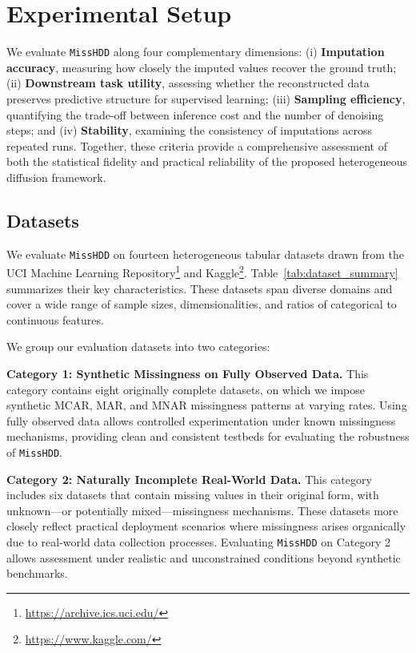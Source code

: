 \documentclass[times, review, 10pt]{elsarticle}
\begin{document}
\section{Experimental Setup}

We evaluate \texttt{MissHDD} along four complementary dimensions:
(i) \textbf{Imputation accuracy}, measuring how closely the imputed values recover the ground truth;
(ii) \textbf{Downstream task utility}, assessing whether the reconstructed data preserves predictive structure for supervised learning;
(iii) \textbf{Sampling efficiency}, quantifying the trade-off between inference cost and the number of denoising steps; and
(iv) \textbf{Stability}, examining the consistency of imputations across repeated runs.
Together, these criteria provide a comprehensive assessment of both the statistical fidelity and practical reliability of the proposed heterogeneous diffusion framework.


\subsection{Datasets}

We evaluate \texttt{MissHDD} on fourteen heterogeneous tabular datasets drawn
from the UCI Machine Learning Repository\footnote{\url{https://archive.ics.uci.edu/}}
and Kaggle\footnote{\url{https://www.kaggle.com/}}.  
Table~\ref{tab:dataset_summary} summarizes their key characteristics.  
These datasets span diverse domains and cover a wide range of sample sizes,
dimensionalities, and ratios of categorical to continuous features.

We group our evaluation datasets into two categories:

\textbf{Category 1: Synthetic Missingness on Fully Observed Data.}
This category contains eight originally complete datasets, on which we impose synthetic MCAR, MAR, and MNAR missingness patterns at varying rates.
Using fully observed data allows controlled experimentation under known missingness mechanisms, providing clean and consistent testbeds for evaluating the robustness of \texttt{MissHDD}.

\textbf{Category 2: Naturally Incomplete Real-World Data.}
This category includes six datasets that contain missing values in their original form, with unknown—or potentially mixed—missingness mechanisms.
These datasets more closely reflect practical deployment scenarios where missingness arises organically due to real-world data collection processes.
Evaluating \texttt{MissHDD} on Category 2 allows assessment under realistic and unconstrained conditions beyond synthetic benchmarks.
\end{document}

